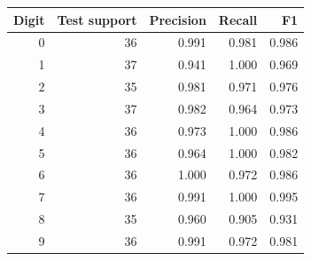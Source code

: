 \begin{tabular}{rrrrr}\toprule
Digit & Test support & Precision & Recall & F1 \\\midrule
0 & 36 & 0.991 & 0.981 & 0.986\\
1 & 37 & 0.941 & 1.000 & 0.969\\
2 & 35 & 0.981 & 0.971 & 0.976\\
3 & 37 & 0.982 & 0.964 & 0.973\\
4 & 36 & 0.973 & 1.000 & 0.986\\
5 & 36 & 0.964 & 1.000 & 0.982\\
6 & 36 & 1.000 & 0.972 & 0.986\\
7 & 36 & 0.991 & 1.000 & 0.995\\
8 & 35 & 0.960 & 0.905 & 0.931\\
9 & 36 & 0.991 & 0.972 & 0.981\\
\bottomrule\end{tabular}